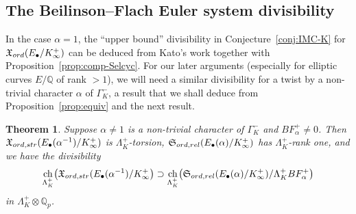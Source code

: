 \documentclass[a4paper,10pt]{amsart}
\numberwithin{equation}{section}
\numberwithin{equation}{section}
\theoremstyle{plain}
\newtheorem{thm}{Theorem}[subsection] %
\theoremstyle{definition}
\newtheorem{rem}[thm]{Remark}
\theoremstyle{definition}
\theoremstyle{plain}
\theoremstyle{plain}
\theoremstyle{plain}
\theoremstyle{plain}
\newcommand{\Q}{\mathbb{Q}}
\newcommand{\X}{\mathfrak{X}}
\DeclareMathOperator{\ch}{ch}
\newcommand{\rH}{\mathrm{H}}
\begin{document}
 
\subsection{The Beilinson--Flach Euler system divisibility}\label{sec:BF}

In the case $\alpha=1$, the ``upper bound'' divisibility in Conjecture~\ref{conj:IMC-K} for $\X_{\rm ord}(E_\bullet/K_\infty^+)$ can be deduced from Kato's work together with Proposition~\ref{prop:comp-Selcyc}. 
For our later arguments (especially for elliptic curves $E/\Q$ of rank $>1$), we will need a similar divisibility for a twist by a non-trivial character $\alpha$ of $\Gamma_K^-$, a result that we shall deduce from 
Proposition~\ref{prop:equiv} and the next result.


\begin{thm}\label{thm:BF-ES} 
Suppose $\alpha\neq 1$ is a non-trivial character of $\Gamma_K^-$ and 
$BF_{\alpha}^+\neq 0$. Then $\X_{\rm ord,\rm str}(E_\bullet(\alpha^{-1})/K_\infty^+)$ is $\Lambda_K^+$-torsion,  $\mathfrak{S}_{\rm ord,\rm rel}(E_\bullet(\alpha)/K_\infty^+)$ has $\Lambda_K^+$-rank one, and we have the divisibility
\[
\ch_{\Lambda_K^+}\bigl(\X_{\rm ord,\rm str}(E_\bullet(\alpha^{-1})/K_\infty^+\bigr)\supset\ch_{\Lambda_K^+}\bigl(\mathfrak{S}_{\rm ord,\rm rel}(E_\bullet(\alpha)/K_\infty^+)/\Lambda_K^+BF_{\alpha}^+\bigr)
\]
in $\Lambda_K^+\otimes\Q_p$.
\end{thm}
\end{document}
